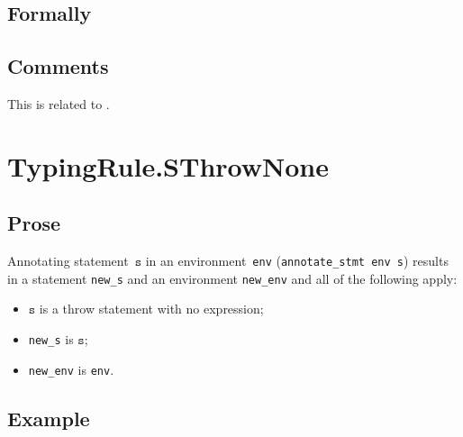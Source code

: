 \documentclass{book}
\newcommand\annotateexpr[1]{\textsf{annotate\_expr}(#1)}
\newcommand\annotatestmt[1]{\texttt{annotate\_stmt}(#1)}
\newcommand\newtenv[0]{\texttt{new\_tenv}}
\newcommand\veone[0]{\texttt{e1}}
\newcommand\vetwo[0]{\texttt{e2}}
\newcommand\vs[0]{\texttt{s}}
\newcommand\news[0]{\texttt{new\_s}}
\newcommand\dir[0]{\texttt{dir}}
\begin{document}
\begin{itemize}

\begin{emptyformal}
    \subsection{Formally}
\end{emptyformal}

\subsection{Comments}
    This is related to .


\section{TypingRule.SThrowNone \label{sec:TypingRule.SThrowNone}}

  \subsection{Prose}
Annotating statement~$\vs$ in an environment~\texttt{env}
(\texttt{annotate\_stmt env s}) results in a statement \texttt{new\_s} and an
environment \texttt{new\_env} and all of the following apply:
   \begin{itemize}
   \item $\vs$ is a throw statement with no expression;
   \item \texttt{new\_s} is $\vs$;
   \item \texttt{new\_env} is \texttt{env}.
   \end{itemize}

  \subsection{Example}



\end{itemize}
\end{document}
